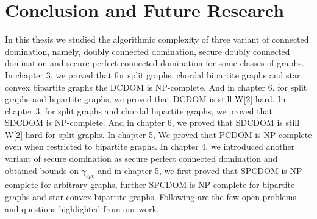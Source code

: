 \chapter{Conclusion and Future Research} 
\noindent
In this thesis we studied the algorithmic complexity of three variant of connected domination, namely, doubly connected domination, secure doubly connected domination and secure perfect connected domination for some classes of graphs. In chapter 3, we proved that for split graphs, chordal bipartite graphs and star convex bipartite graphs the DCDOM is NP-complete. And in chapter 6, for split graphs and bipartite graphs, we proved that DCDOM is still W[2]-hard. In chapter 3, for split graphs and chordal bipartite graphs, we proved that SDCDOM is NP-complete. And in chapter 6, we proved that SDCDOM is still W[2]-hard for split graphs. In chapter 5, We proved that PCDOM is NP-complete even when restricted to bipartite graphs. In chapter 4, we introduced another variant of secure domination as secure perfect connected domination and obtained bounds on $\gamma_{spc}$ and in chapter 5, we first proved that SPCDOM is NP-complete for arbitrary graphs, further SPCDOM is NP-complete for bipartite graphs and star convex bipartite graphs. Following are the few open problems and questions highlighted from our work.
